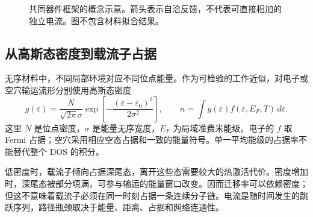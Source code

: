 \documentclass[11pt,a4paper]{article}
\begin{document}
\begin{figure}[htbp]\centering
{}
\caption{{\cjkfont 共同器件框架的概念示意。箭头表示自洽反馈，不代表可直接相加的独立电流。图不包含材料拟合结果。}\allowbreak{}}\label{fig:common-framework}
\end{figure}

\subsection{{\cjkfont 从高斯态密度到载流子占据}\allowbreak{}}
{\cjkfont 无序材料中，不同局部环境对应不同位点能量。作为可检验的工作近似，对电子或空穴输运流形分别使用高斯态密度}\allowbreak{}
\begin{equation}
 g(\varepsilon)=\frac{N}{\sqrt{2\pi}\sigma}\exp\!\left[-\frac{(\varepsilon-\varepsilon_0)^2}{2\sigma^2}\right],\qquad
 n=\int g(\varepsilon)f(\varepsilon,E_F,T)\,d\varepsilon .
\end{equation}
{\cjkfont 这里}\allowbreak{} $N$ {\cjkfont 是位点密度，}\allowbreak{}$\sigma$ {\cjkfont 是能量无序宽度，}\allowbreak{}$E_F$ {\cjkfont 为局域准费米能级。电子的}\allowbreak{} $f$ {\cjkfont 取}\allowbreak{} Fermi {\cjkfont 占据；空穴采用相应空态占据和一致的能量符号。单一平均能级的占据率不能替代整个}\allowbreak{} DOS {\cjkfont 的积分。}\allowbreak{}

{\cjkfont 低密度时，载流子倾向占据深尾态，离开这些态需要较大的热激活代价。密度增加时，深尾态被部分填满，可参与输运的能量窗口改变。因而迁移率可以依赖密度；但这不意味着载流子必须在同一时刻占据一条连续分子链。电流是随时间发生的跳跃序列，路径瓶颈取决于能量、距离、占据和网络连通性。}\allowbreak{}
\end{document}
